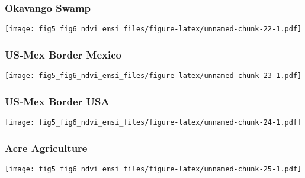 \documentclass[
]{article}
\begin{document}
\hypertarget{okavango-swamp}{%
\subsubsection{Okavango Swamp}\label{okavango-swamp}}

\texttt{[image: fig5\_fig6\_ndvi\_emsi\_files/figure-latex/unnamed-chunk-22-1.pdf]}

\hypertarget{htmlwidget-fd469c644fb84d280e04}{}
\begin{plotly}

\end{plotly}

\hypertarget{us-mex-border-mexico}{%
\subsubsection{US-Mex Border Mexico}\label{us-mex-border-mexico}}

\texttt{[image: fig5\_fig6\_ndvi\_emsi\_files/figure-latex/unnamed-chunk-23-1.pdf]}

\hypertarget{htmlwidget-b26c959b796d5aecd9cd}{}
\begin{plotly}

\end{plotly}

\hypertarget{us-mex-border-usa}{%
\subsubsection{US-Mex Border USA}\label{us-mex-border-usa}}

\texttt{[image: fig5\_fig6\_ndvi\_emsi\_files/figure-latex/unnamed-chunk-24-1.pdf]}

\hypertarget{htmlwidget-1e1776bc6607d6444610}{}
\begin{plotly}

\end{plotly}

\hypertarget{acre-agriculture}{%
\subsubsection{Acre Agriculture}\label{acre-agriculture}}

\texttt{[image: fig5\_fig6\_ndvi\_emsi\_files/figure-latex/unnamed-chunk-25-1.pdf]}

\hypertarget{htmlwidget-26c919c39df417c8e5f9}{}
\begin{plotly}

\end{plotly}
\end{document}
